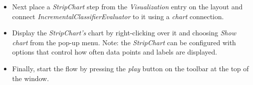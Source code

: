 \begin{itemize}
        \item Next place a \textit{StripChart} step from the \textit{Visualization}
        entry on the layout and connect \textit{IncrementalClassifierEvaluator} to it
        using a \textit{chart} connection.

        \item Display the \textit{StripChart's} chart by right-clicking over it and choosing
        \textit{Show chart} from the pop-up menu. Note: the \textit{StripChart} can be configured
        with options that control how often data points and labels are displayed.

        \item Finally, start the flow by pressing the \textit{play} button on the toolbar at the top of the window.        
\end{itemize}

